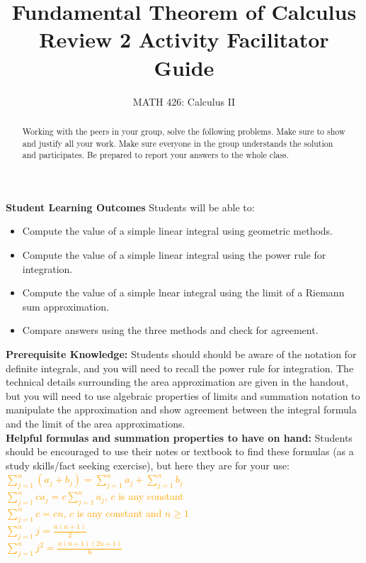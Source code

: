 \documentclass{ximera}
\title{Fundamental Theorem of Calculus Review 2 Activity Facilitator Guide}
\author{MATH 426: Calculus II}
\begin{document}
\begin{abstract}
   Working with the peers in your group, solve the following problems. Make sure to show and justify all your work. Make sure everyone in the group understands the solution and participates. Be prepared to report your answers to the whole class. 
\end{abstract}
\maketitle

\textbf{Student Learning Outcomes}
Students will be able to:
    \begin{itemize}
        \item Compute the value of a simple linear integral using geometric methods.
        \item Compute the value of a simple linear integral using the power rule for integration.
        \item Compute the value of a simple lnear integral using the limit of a Riemann sum approximation.
        \item Compare answers using the three methods and check for agreement.
    \end{itemize}
\textbf{Prerequisite Knowledge:} Students should should be aware of the notation for definite integrals, and you will need to recall the power rule for integration. The technical details surrounding the area approximation are given in the handout, but you will need to use algebraic properties of limits and summation notation to manipulate the approximation and show agreement between the integral formula and the limit of the area approximations.\\
\textbf{Helpful formulas and summation properties to have on hand:} Students should be encouraged to use their notes or textbook to find these formulas (as a study skills/fact seeking exercise), but here they are for your use: \\
\textcolor{orange}{$\displaystyle\sum_{j=1}^n(a_j+b_j)=\sum_{j=1}^n a_j+\sum_{j=1}^n b_j$}\\

\textcolor{orange}{$\displaystyle \sum_{j=1}^n ca_j=c\sum_{j=1}^n a_j$, $c$ is any constant}\\
\textcolor{orange}{$\displaystyle \sum_{j=1}^n c=cn$, $c$ is any constant and $n\geq 1$}\\
\textcolor{orange}{$\displaystyle \sum_{j=1}^n j=\frac{n(n+1)}{2}$}\\
\textcolor{orange}{$\displaystyle \sum_{j=1}^n j^2 =\frac{n(n+1)(2n+1)}{6}$}\\
\end{document}
